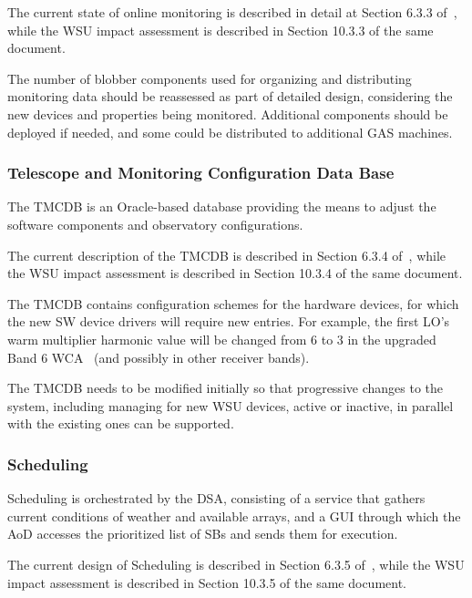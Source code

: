 The current state of online monitoring is described in detail at Section 6.3.3 of~\cite{CSA-IA}, while the WSU impact assessment is described in Section 10.3.3 of the same document.

The number of blobber components used for organizing and distributing monitoring data should be reassessed as part of detailed design, considering the new devices and properties being monitored. Additional components should be deployed if needed, and some could be distributed to additional GAS machines.

\subsubsection{Telescope and Monitoring Configuration Data Base} \label{sec:TMCDB}
The TMCDB is an Oracle-based database providing the means to adjust the software components and observatory configurations.

The current description of the TMCDB is described in Section 6.3.4 of~\cite{CSA-IA}, while the WSU impact assessment is described in Section 10.3.4 of the same document.

The TMCDB contains configuration schemes for the hardware devices, for which the new SW device drivers will require new entries. For example, the first LO’s warm multiplier harmonic value will be changed from 6 to 3 in the upgraded Band 6 WCA~\cite{band6v2_pp} (and possibly in other receiver bands).

The TMCDB needs to be modified initially so that progressive changes to the system, including managing for new WSU devices, active or inactive, in parallel with the existing ones can be supported.

\subsubsection{Scheduling}\label{sec:scheduling_software}
Scheduling is orchestrated by the \ac{DSA}, consisting of a service that gathers current conditions of weather and available arrays, and a GUI through which the AoD accesses the prioritized list of SBs and sends them for execution.

The current design of Scheduling is described in Section 6.3.5 of~\cite{CSA-IA}, while the WSU impact assessment is described in Section 10.3.5 of the same document.

